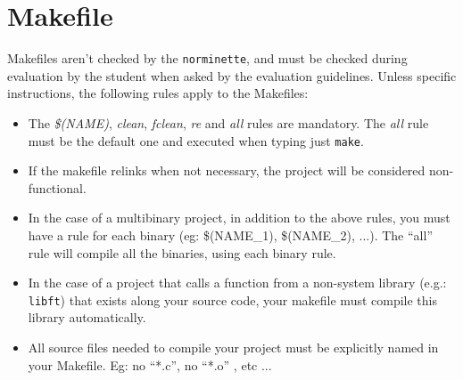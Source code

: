 \documentclass{42-en}
\begin{document}
    \section{Makefile}

            Makefiles aren't checked by the \texttt{norminette}, and must be checked during evaluation by
            the student when asked by the evaluation guidelines. Unless specific instructions, the following rules
            apply to the Makefiles:
            \begin{itemize}

                \item The \textit{\$(NAME)}, \textit{clean}, \textit{fclean}, \textit{re} and \textit{all}
                  rules are mandatory. The \textit{all} rule must be the default one and executed when typing just \texttt{make}.

                \item If the makefile relinks when not necessary, the project will be considered
                  non-functional.

                \item In the case of a multibinary project, in addition to
                  the above rules, you must have a rule for each binary (eg: \$(NAME\_1), \$(NAME\_2), ...).
                  The ``all'' rule will compile all the binaries, using each binary rule.

                  \item In the case of a project that calls a function from a non-system library
                  (e.g.: \texttt{libft}) that exists along your source code, your makefile must compile
                  this library automatically.

                  \item All source files needed to compile your project must
                    be explicitly named in your Makefile. Eg: no ``*.c'', no ``*.o'' , etc ...

            \end{itemize}
\end{document}
